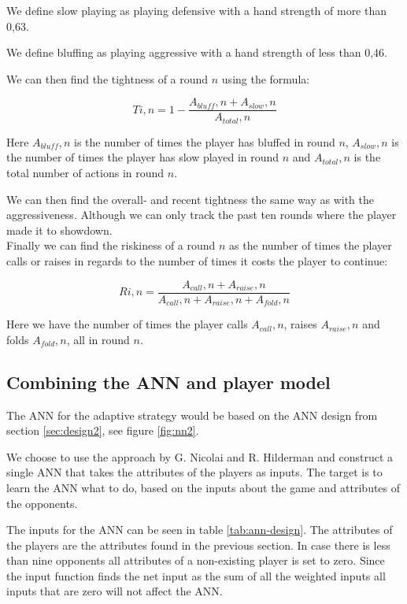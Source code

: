 We define slow playing as playing defensive with a hand strength of more than 0,63.

We define bluffing as playing aggressive with a hand strength of less than 0,46.

We can then find the tightness of a round $n$ using the formula:

\[Ti,n = 1 - \frac{A_{bluff},n + A_{slow},n}{A_{total},n}\]

Here $A_{bluff},n$ is the number of times the player has bluffed in round $n$, $A_{slow},n$ is the number of times the player has slow played in round $n$ and $A_{total},n$ is the total number of actions in round $n$.

We can then find the overall- and recent tightness the same way as with the aggressiveness. Although we can only track the past ten rounds where the player made it to showdown.\\

Finally we can find the riskiness of a round $n$ as the number of times the player calls or raises in regards to the number of times it costs the player to continue:

\[Ri,n = \frac{A_{call},n + A_{raise},n}{A_{call},n + A_{raise},n + A_{fold},n}\]

Here we have the number of times the player calls $A_{call},n$, raises $A_{raise},n$ and folds $A_{fold},n$, all in round $n$.

\subsection{Combining the ANN and player model}
The ANN for the adaptive strategy would be based on the ANN design from section \ref{sec:design2}, see figure \ref{fig:nn2}. 


We choose to use the approach by G. Nicolai and R. Hilderman and construct a single ANN that takes the attributes of the players as inputs. The target is to learn the ANN what to do, based on the inputs about the game and attributes of the opponents.

The inputs for the ANN can be seen in table \ref{tab:ann-design}. The attributes of the players are the attributes found in the previous section. In case there is less than nine opponents all attributes of a non-existing player is set to zero. Since the input function finds the net input as the sum of all the weighted inputs all inputs that are zero will not affect the ANN.

